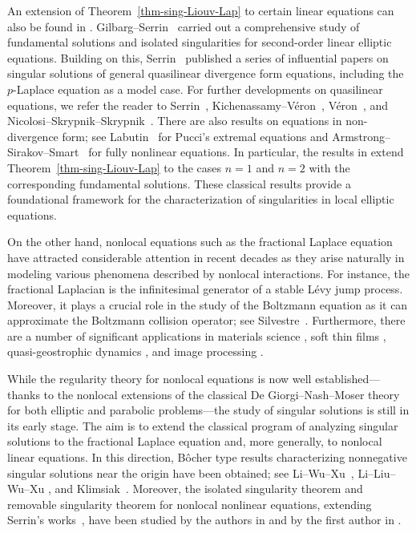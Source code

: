 \documentclass[11pt]{amsart}
\theoremstyle{plain}
\theoremstyle{definition}
\numberwithin{equation}{section}
\begin{document}
An extension of Theorem~\ref{thm-sing-Liouv-Lap} to certain linear equations can also be found in \cite{Boc03}. Gilbarg--Serrin~\cite{GS56} carried out a comprehensive study of fundamental solutions and isolated singularities for second-order linear elliptic equations. Building on this, Serrin~\cite{Ser64a,Ser65a} published a series of influential papers on singular solutions of general quasilinear divergence form equations, including the $p$-Laplace equation as a model case. For further developments on quasilinear equations, we refer the reader to Serrin~\cite{Ser65b}, Kichenassamy--V\'eron~\cite{KV86}, V\'eron~\cite{Ver96}, and Nicolosi--Skrypnik--Skrypnik~\cite{NSS03}. There are also results on equations in non-divergence form; see Labutin~\cite{Lab00,Lab01} for Pucci’s extremal equations and Armstrong--Sirakov--Smart~\cite{ASS11} for fully nonlinear equations. In particular, the results in \cite{ASS11} extend Theorem~\ref{thm-sing-Liouv-Lap} to the cases $n=1$ and $n=2$ with the corresponding fundamental solutions. These classical results provide a foundational framework for the characterization of singularities in local elliptic equations.

On the other hand, nonlocal equations such as the fractional Laplace equation have attracted considerable attention in recent decades as they arise naturally in modeling various phenomena described by nonlocal interactions. For instance, the fractional Laplacian is the infinitesimal generator of a stable L\'evy jump process. Moreover, it plays a crucial role in the study of the Boltzmann equation as it can approximate the Boltzmann collision operator; see Silvestre~\cite{Sil16}. Furthermore, there are a number of significant applications in materials science \cite{Bat06,BC99}, soft thin films \cite{Kur06}, quasi-geostrophic dynamics \cite{CV10}, and image processing \cite{GO08}.

While the regularity theory for nonlocal equations is now well established---thanks to the nonlocal extensions of the classical De Giorgi--Nash--Moser theory for both elliptic \cite{Coz17,DCKP14,DCKP16,Kas09} and parabolic \cite{CCV11,FK13,KW24b} problems---the study of singular solutions is still in its early stage. The aim is to extend the classical program of analyzing singular solutions to the fractional Laplace equation and, more generally, to nonlocal linear equations. In this direction, B\^ocher type results characterizing nonnegative singular solutions near the origin have been obtained; see Li--Wu--Xu~\cite{LWX18}, Li--Liu--Wu--Xu \cite{LLWX20}, and Klimsiak~\cite{Kli25}. Moreover, the isolated singularity theorem and removable singularity theorem for nonlocal nonlinear equations, extending Serrin's works~\cite{Ser64a,Ser65a,Ser65b}, have been studied by the authors in \cite{KL24} and by the first author in \cite{Kim25}.
\end{document}
